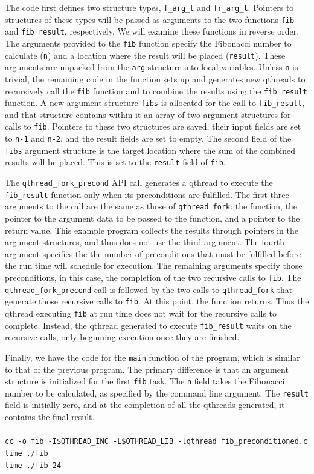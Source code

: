 \documentclass[12pt,fullpage]{article}
\begin{document}
The code first defines two structure types, {\tt f\_arg\_t} and {\tt fr\_arg\_t}.  Pointers to structures of these types will be passed as arguments to the two functions {\tt fib} and {\tt fib\_result}, respectively.  We will examine these functions in reverse order.  The arguments provided to the {\tt fib} function specify the Fibonacci number to calculate ({\tt n}) and a location where the result will be placed ({\tt result}).   These arguments are unpacked from the {\tt arg} structure into local variables.  Unless {\tt n} is trivial, the remaining code in the function sets up and generates new qthreads to recursively call the {\tt fib} function and to combine the results using the {\tt fib\_result} function.  A new argument structure {\tt fibs} is allocated for the call to {\tt fib\_result}, and that structure contains within it an array of two argument structures for calls to {\tt fib}.  Pointers to these two structures are saved, their input fields are set to {\tt n-1} and {\tt n-2}, and the result fields are set to empty.  The second field of the {\tt fibs} argument structure is the target location where the sum of the combined results will be placed.  This is set to the {\tt result} field of {\tt fib}.

The {\tt qthread\_fork\_precond} API call generates a qthread to execute the {\tt fib\_result} function only when its preconditions are fulfilled.  The first three arguments to the call are the same as those of {\tt qthread\_fork}: the function, the pointer to the argument data to be passed to the function, and a pointer to the return value.  This example program collects the results through pointers in the argument structures, and thus does not use the third argument.  The fourth argument specifies the the number of preconditions that must be fulfilled before the run time will schedule for execution.  The remaining arguments specify those preconditions, in this case, the completion of the two recursive calls to {\tt fib}.  The {\tt qthread\_fork\_precond} call is followed by the two calls to {\tt qthread\_fork} that generate those recursive calls to {\tt fib}.  At this point, the function returns.  Thus the qthread executing {\tt fib} at run time does not wait for the recursive calls to complete.  Instead, the qthread generated to execute {\tt fib\_result} waits on the recursive calls, only beginning execution once they are finished.

Finally, we have the code for the {\tt main} function of the program, which is similar to that of the previous program.  The primary difference is that an argument structure is initialized for the first {\tt fib} task.  The {\tt n} field takes the Fibonacci number to be calculated, as specified by the command line argument.  The {\tt result} field is initially zero, and at the completion of all the qthreads generated, it contains the final result.
\\ \\
{\footnotesize{\tt cc -o fib -I\$QTHREAD\_INC -L\$QTHREAD\_LIB -lqthread fib\_preconditioned.c}}
\\
{\footnotesize{\tt time ./fib}}
\\
{\footnotesize{\tt time ./fib 24}}
\newpage
\end{document}
